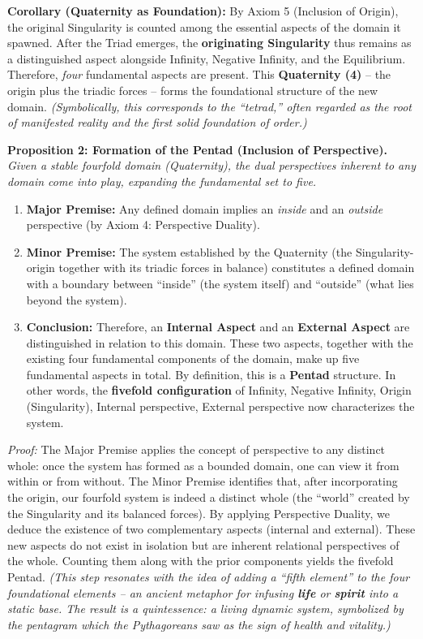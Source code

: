 \documentclass[11pt]{article}
\theoremstyle{plain}
\begin{document}
\textbf{Corollary (Quaternity as Foundation):} By Axiom 5 (Inclusion of Origin), the original Singularity is counted among the essential aspects of the domain it spawned. After the Triad emerges, the \textbf{originating Singularity} thus remains as a distinguished aspect alongside Infinity, Negative Infinity, and the Equilibrium. Therefore, \textit{four} fundamental aspects are present. This \textbf{Quaternity (4)} – the origin plus the triadic forces – forms the foundational structure of the new domain. \textit{(Symbolically, this corresponds to the “tetrad,” often regarded as the root of manifested reality and the first solid foundation of order.)}

\textbf{Proposition 2: Formation of the Pentad (Inclusion of Perspective).} \textit{Given a stable fourfold domain (Quaternity), the dual perspectives inherent to any domain come into play, expanding the fundamental set to five.}

\begin{enumerate}
    \item \textbf{Major Premise:} Any defined domain implies an \textit{inside} and an \textit{outside} perspective (by Axiom 4: Perspective Duality).
    \item \textbf{Minor Premise:} The system established by the Quaternity (the Singularity-origin together with its triadic forces in balance) constitutes a defined domain with a boundary between “inside” (the system itself) and “outside” (what lies beyond the system).
    \item \textbf{Conclusion:} Therefore, an \textbf{Internal Aspect} and an \textbf{External Aspect} are distinguished in relation to this domain. These two aspects, together with the existing four fundamental components of the domain, make up five fundamental aspects in total. By definition, this is a \textbf{Pentad} structure. In other words, the \textbf{fivefold configuration} of {Infinity, Negative Infinity, Origin (Singularity), Internal perspective, External perspective} now characterizes the system.
\end{enumerate}

\textit{Proof:} The Major Premise applies the concept of perspective to any distinct whole: once the system has formed as a bounded domain, one can view it from within or from without. The Minor Premise identifies that, after incorporating the origin, our fourfold system is indeed a distinct whole (the “world” created by the Singularity and its balanced forces). By applying Perspective Duality, we deduce the existence of two complementary aspects (internal and external). These new aspects do not exist in isolation but are inherent relational perspectives of the whole. Counting them along with the prior components yields the fivefold Pentad. \textit{(This step resonates with the idea of adding a “fifth element” to the four foundational elements – an ancient metaphor for infusing \textbf{life} or \textbf{spirit} into a static base. The result is a quintessence: a living dynamic system, symbolized by the pentagram which the Pythagoreans saw as the sign of health and vitality.)}
\end{document}
